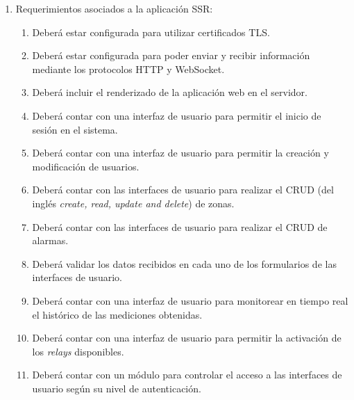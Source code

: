 \begin{enumerate}

	\item Requerimientos asociados a la aplicación SSR:
		\begin{enumerate}
			\item Deberá estar configurada para utilizar certificados TLS.
			\item Deberá estar configurada para poder enviar y recibir información mediante los protocolos HTTP y WebSocket.
			\item Deberá incluir el renderizado de la aplicación web en el servidor.
			\item Deberá contar con una interfaz de usuario para permitir el inicio de sesión en el sistema.
			\item Deberá contar con una interfaz de usuario para permitir la creación y modificación de usuarios.
			\item Deberá contar con las interfaces de usuario para realizar el CRUD (del inglés \textit{create, read, update and delete}) \citep{WEBSITE:CRUD} de zonas.
			\item Deberá contar con las interfaces de usuario para realizar el CRUD de alarmas.
			\item Deberá validar los datos recibidos en cada uno de los formularios de las interfaces de usuario.
			\item Deberá contar con una interfaz de usuario para monitorear en tiempo real el histórico de las mediciones obtenidas.
			\item Deberá contar con una interfaz de usuario para permitir la activación de los \textit{relays} disponibles.
			\item Deberá contar con un módulo para controlar el acceso a las interfaces de usuario según su nivel de autenticación.
		\end{enumerate}
		

\end{enumerate}
